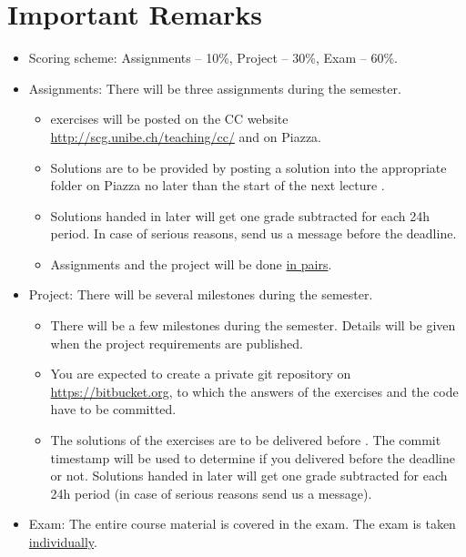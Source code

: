 
\subtitle{Assignment 1: Introduction}


\makefancytitle

\section{Important Remarks}

\begin{itemize}
\item Scoring scheme: Assignments -- 10\%, Project -- 30\%, Exam -- 60\%.
\item Assignments: There will be three assignments during the semester.
  \begin{itemize}
  \item {} exercises will be posted on the CC website \url{http://scg.unibe.ch/teaching/cc/} and on Piazza. 
  \item Solutions are to be provided by posting a solution into the appropriate folder on Piazza no later than the start of the next lecture .
  \item Solutions handed in later will get one grade subtracted for each 24h period. In case of serious reasons, send us a message before the deadline.
  \item Assignments and the project will be done \underline{in pairs}.
  \end{itemize}
\item Project: There will be several milestones during the semester.
  \begin{itemize}
  \item There will be a few milestones during the semester. Details will be given when the project requirements are published.
  \item You are expected to create a private git repository on \url{https://bitbucket.org}, to which the answers of the exercises and the code have to be committed.
  \item The solutions of the exercises are to be delivered before . The commit timestamp will be used to determine if you delivered before the deadline or not. Solutions handed in later will get one grade subtracted for each 24h period (in case of serious reasons send us a message).
  \end{itemize}
\item Exam: The entire course material is covered in the exam. The exam is taken \underline{individually}.
\end{itemize}


